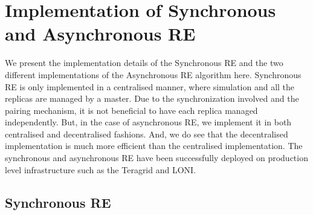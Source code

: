 \documentclass{rspublic}
\begin{document}
\section{Implementation of Synchronous and Asynchronous RE}
We present the implementation details of the Synchronous RE and the two different implementations of the Asynchronous RE algorithm here. Synchronous RE is only implemented in a centralised manner, where simulation and all the replicas are managed by a master. Due to the synchronization involved and the pairing mechanism, it is not beneficial to have each replica managed independently. But, in the case of asynchronous RE, we implement it in both centralised and decentralised  fashions. And, we do see that the decentralised implementation is much more efficient than the centralised implementation.
The synchronous and asynchronous RE have been successfully deployed on production level infrastructure such as the Teragrid and LONI. 

\subsection{Synchronous RE}
\end{document}
